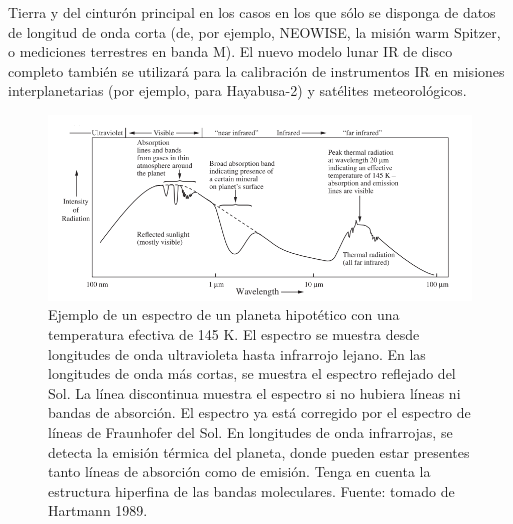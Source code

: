 \documentclass[12pt]{article}
\begin{document}
Tierra y del cinturón principal en los casos en los que sólo se disponga de datos de longitud 
de onda corta (de, por ejemplo, NEOWISE, la misión warm Spitzer, o mediciones terrestres en 
banda M). El nuevo modelo lunar IR de disco completo también se utilizará para la calibración 
de instrumentos IR en misiones interplanetarias (por ejemplo, para Hayabusa-2) y satélites 
meteorológicos.
\begin{figure}[H]
    \centering
    \includegraphics[width=1\textwidth]{images/Emision_moon_example.png}
    \caption{Ejemplo de un espectro de un planeta hipotético con una temperatura efectiva de 145 K. 
    El espectro se muestra desde longitudes de onda ultravioleta hasta infrarrojo lejano. 
    En las longitudes de onda más cortas, se muestra el espectro reflejado del Sol. La línea 
    discontinua muestra el espectro si no hubiera líneas ni bandas de absorción. El espectro ya 
    está corregido por el espectro de líneas de Fraunhofer del Sol. En longitudes de onda infrarrojas, 
    se detecta la emisión térmica del planeta, donde pueden estar presentes tanto líneas de absorción 
    como de emisión. Tenga en cuenta la estructura hiperfina de las bandas moleculares.
    Fuente: tomado de Hartmann 1989.}
    \label{fig:ejemplo_emision_luna}
\end{figure}
\end{document}
